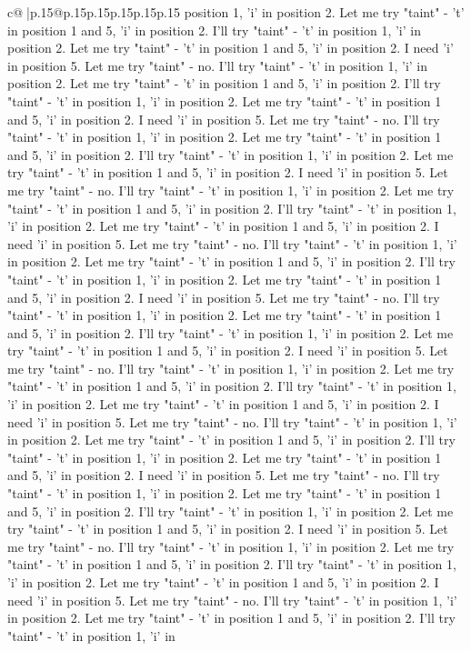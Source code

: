 \documentclass{article}
\begin{document}
{\begin{supertabular}{c@{$\;$}|p{.15\linewidth}@{}p{.15\linewidth}p{.15\linewidth}p{.15\linewidth}p{.15\linewidth}p{.15\linewidth}}
{{{position 1, 'i' in position 2. Let me try "taint" {-} 't' in position 1 and 5, 'i' in position 2. I'll try "taint" {-} 't' in position 1, 'i' in position 2. Let me try "taint" {-} 't' in position 1 and 5, 'i' in position 2. I need 'i' in position 5. Let me try "taint" {-} no. I'll try "taint" {-} 't' in position 1, 'i' in position 2. Let me try "taint" {-} 't' in position 1 and 5, 'i' in position 2. I'll try "taint" {-} 't' in position 1, 'i' in position 2. Let me try "taint" {-} 't' in position 1 and 5, 'i' in position 2. I need 'i' in position 5. Let me try "taint" {-} no. I'll try "taint" {-} 't' in position 1, 'i' in position 2. Let me try "taint" {-} 't' in position 1 and 5, 'i' in position 2. I'll try "taint" {-} 't' in position 1, 'i' in position 2. Let me try "taint" {-} 't' in position 1 and 5, 'i' in position 2. I need 'i' in position 5. Let me try "taint" {-} no. I'll try "taint" {-} 't' in position 1, 'i' in position 2. Let me try "taint" {-} 't' in position 1 and 5, 'i' in position 2. I'll try "taint" {-} 't' in position 1, 'i' in position 2. Let me try "taint" {-} 't' in position 1 and 5, 'i' in position 2. I need 'i' in position 5. Let me try "taint" {-} no. I'll try "taint" {-} 't' in position 1, 'i' in position 2. Let me try "taint" {-} 't' in position 1 and 5, 'i' in position 2. I'll try "taint" {-} 't' in position 1, 'i' in position 2. Let me try "taint" {-} 't' in position 1 and 5, 'i' in position 2. I need 'i' in position 5. Let me try "taint" {-} no. I'll try "taint" {-} 't' in position 1, 'i' in position 2. Let me try "taint" {-} 't' in position 1 and 5, 'i' in position 2. I'll try "taint" {-} 't' in position 1, 'i' in position 2. Let me try "taint" {-} 't' in position 1 and 5, 'i' in position 2. I need 'i' in position 5. Let me try "taint" {-} no. I'll try "taint" {-} 't' in position 1, 'i' in position 2. Let me try "taint" {-} 't' in position 1 and 5, 'i' in position 2. I'll try "taint" {-} 't' in position 1, 'i' in position 2. Let me try "taint" {-} 't' in position 1 and 5, 'i' in position 2. I need 'i' in position 5. Let me try "taint" {-} no. I'll try "taint" {-} 't' in position 1, 'i' in position 2. Let me try "taint" {-} 't' in position 1 and 5, 'i' in position 2. I'll try "taint" {-} 't' in position 1, 'i' in position 2. Let me try "taint" {-} 't' in position 1 and 5, 'i' in position 2. I need 'i' in position 5. Let me try "taint" {-} no. I'll try "taint" {-} 't' in position 1, 'i' in position 2. Let me try "taint" {-} 't' in position 1 and 5, 'i' in position 2. I'll try "taint" {-} 't' in position 1, 'i' in position 2. Let me try "taint" {-} 't' in position 1 and 5, 'i' in position 2. I need 'i' in position 5. Let me try "taint" {-} no. I'll try "taint" {-} 't' in position 1, 'i' in position 2. Let me try "taint" {-} 't' in position 1 and 5, 'i' in position 2. I'll try "taint" {-} 't' in position 1, 'i' in position 2. Let me try "taint" {-} 't' in position 1 and 5, 'i' in position 2. I need 'i' in position 5. Let me try "taint" {-} no. I'll try "taint" {-} 't' in position 1, 'i' in position 2. Let me try "taint" {-} 't' in position 1 and 5, 'i' in position 2. I'll try "taint" {-} 't' in position 1, 'i' in }}}
\end{supertabular}}
\end{document}
